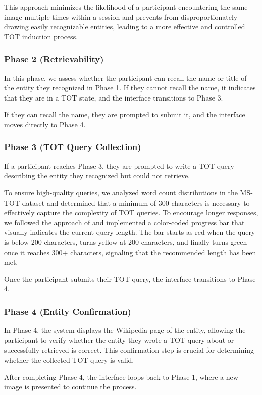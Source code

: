 This approach minimizes the likelihood of a participant encountering the same image multiple times within a session and prevents from disproportionately drawing easily recognizable entities, leading to a more effective and controlled TOT induction process.



\subsubsection{\textbf{Phase 2 (Retrievability)}}
In this phase, we assess whether the participant can recall the name or title of the entity they recognized in Phase 1. If they cannot recall the name, it indicates that they are in a TOT state, and the interface transitions to Phase 3.

If they can recall the name, they are prompted to submit it, and the interface moves directly to Phase 4.


\subsubsection{\textbf{Phase 3 (TOT Query Collection)}}
If a participant reaches Phase 3, they are prompted to write a TOT query describing the entity they recognized but could not retrieve.

To ensure high-quality queries, we analyzed word count distributions in the MS-TOT dataset and determined that a minimum of 300 characters is necessary to effectively capture the complexity of TOT queries. To encourage longer responses, we followed the approach of \citet{agapie-13-longerqueries} and implemented a color-coded progress bar that visually indicates the current query length. The bar starts as red when the query is below 200 characters, turns yellow at 200 characters, and finally turns green once it reaches 300+ characters, signaling that the recommended length has been met.

Once the participant submits their TOT query, the interface transitions to Phase 4.


\subsubsection{\textbf{Phase 4 (Entity Confirmation)}}

In Phase 4, the system displays the Wikipedia page of the entity, allowing the participant to verify whether the entity they wrote a TOT query about or successfully retrieved is correct. This confirmation step is crucial for determining whether the collected TOT query is valid. 

After completing Phase 4, the interface loops back to Phase 1, where a new image is presented to continue the process.





